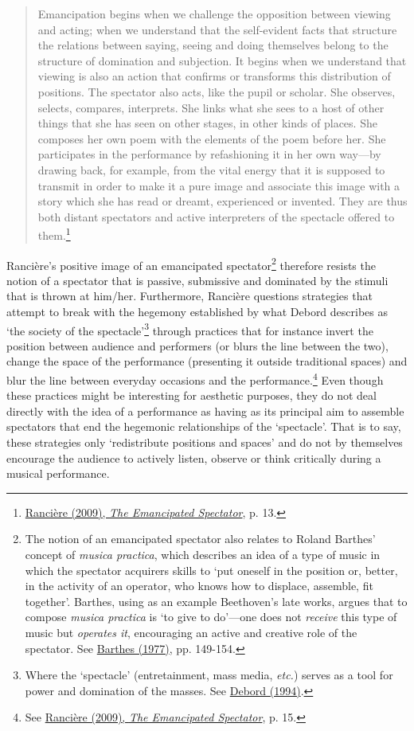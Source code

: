 \begin{quote}
Emancipation begins when we challenge the opposition between viewing and acting; when we understand that the self-evident facts that structure the relations between saying, seeing and doing themselves belong to the structure of domination and subjection. It begins when we understand that viewing is also an action that confirms or transforms this distribution of positions. The spectator also acts, like the pupil or scholar. She observes, selects, compares, interprets. She links what she sees to a host of other things that she has seen on other stages, in other kinds of places. She composes her own poem with the elements of the poem before her. She participates in the performance by refashioning it in her own way---by drawing back, for example, from the vital energy that it is supposed to transmit in order to make it a pure image and associate this image with a story which she has read or dreamt, experienced or invented. They are thus both distant spectators and active interpreters of the spectacle offered to them.\footnote{\hyperlink{ranspec}{Ranci\`{e}re (2009), \emph{The Emancipated Spectator}}, p. 13.}
\end{quote}

Ranci\`{e}re's positive image of an emancipated spectator\footnote{The notion of an emancipated spectator also relates to Roland Barthes' concept of \emph{musica practica}, which describes an idea of a type of music in which the spectator acquirers skills to `put oneself in the position or, better, in the activity of an operator, who knows how to displace, assemble, fit together'. Barthes, using as an example Beethoven's late works, argues that to compose \emph{musica practica} is `to give to do'---one does not \emph{receive} this type of music but \emph{operates it}, encouraging an active and creative role of the spectator. See \hyperlink{barthes}{Barthes (1977)}, pp. 149-154.} therefore resists the notion of a spectator that is passive, submissive and dominated by the stimuli that is thrown at him/her. Furthermore, Ranci\`{e}re questions strategies that attempt to break with the hegemony established by what Debord describes as `the society of the spectacle'\footnote{Where the `spectacle' (entretainment, mass media, \emph{etc.}) serves as a tool for power and domination of the masses. See \hyperlink{debord}{Debord (1994)}.} through practices that for instance invert the position between audience and performers (or blurs the line between the two), change the space of the performance (presenting it outside traditional spaces) and blur the line between everyday occasions and the performance.\footnote{See \hyperlink{ranspec}{Ranci\`{e}re (2009), \emph{The Emancipated Spectator}}, p. 15.} Even though these practices might be interesting for aesthetic purposes, they do not deal directly with the idea of a performance as having as its principal aim to assemble spectators that end the hegemonic relationships of the `spectacle'. That is to say, these strategies only `redistribute positions and spaces' and do not by themselves encourage the audience to actively listen, observe or think critically during a musical performance. 

